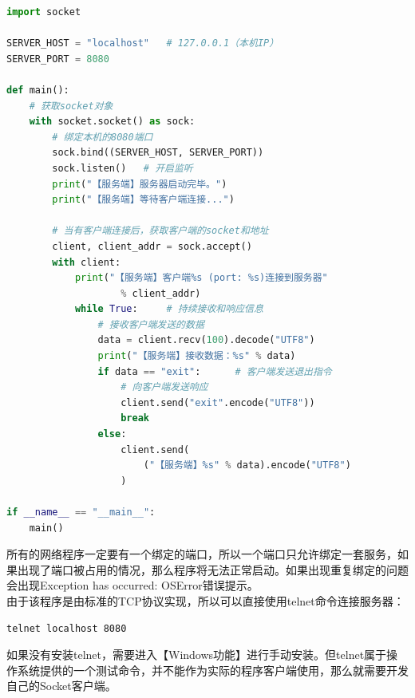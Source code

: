 \vspace{0.5cm}


\begin{lstlisting}[language=Python, title=tcp\_server.py]
import socket

SERVER_HOST = "localhost"   # 127.0.0.1（本机IP）
SERVER_PORT = 8080

def main():
    # 获取socket对象
    with socket.socket() as sock:
        # 绑定本机的8080端口
        sock.bind((SERVER_HOST, SERVER_PORT))
        sock.listen()   # 开启监听
        print("【服务端】服务器启动完毕。")
        print("【服务端】等待客户端连接...")

        # 当有客户端连接后，获取客户端的socket和地址
        client, client_addr = sock.accept()
        with client:
            print("【服务端】客户端%s (port: %s)连接到服务器"
                    % client_addr)
            while True:     # 持续接收和响应信息
                # 接收客户端发送的数据
                data = client.recv(100).decode("UTF8")
                print("【服务端】接收数据：%s" % data)
                if data == "exit":      # 客户端发送退出指令
                    # 向客户端发送响应
                    client.send("exit".encode("UTF8"))
                    break
                else:
                    client.send(
                        ("【服务端】%s" % data).encode("UTF8")
                    )

if __name__ == "__main__":
    main()
\end{lstlisting}

所有的网络程序一定要有一个绑定的端口，所以一个端口只允许绑定一套服务，如果出现了端口被占用的情况，那么程序将无法正常启动。如果出现重复绑定的问题会出现Exception has occurred: OSError错误提示。\\

由于该程序是由标准的TCP协议实现，所以可以直接使用telnet命令连接服务器：

\vspace{-0.5cm}

\begin{lstlisting}
telnet localhost 8080
\end{lstlisting}

如果没有安装telnet，需要进入【Windows功能】进行手动安装。但telnet属于操作系统提供的一个测试命令，并不能作为实际的程序客户端使用，那么就需要开发自己的Socket客户端。

